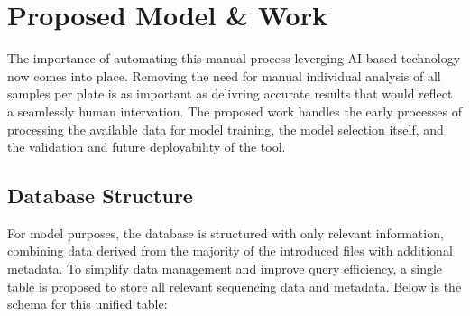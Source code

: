 \section{Proposed Model \& Work}
\label{sec:model}

The importance of automating this manual process leverging AI-based technology now comes into place. Removing the need for manual individual analysis of all samples per plate is as important as delivring accurate results that would reflect a seamlessly human intervation.
The proposed work handles the early processes of processing the available data for model training, the model selection itself, and the validation and future deployability of the tool.

\subsection{Database Structure}
For model purposes, the database is structured with only relevant information, combining data derived from the majority of the introduced files with additional metadata. To simplify data management and improve query efficiency, a single table is proposed to store all relevant sequencing data and metadata. Below is the schema for this unified table:

